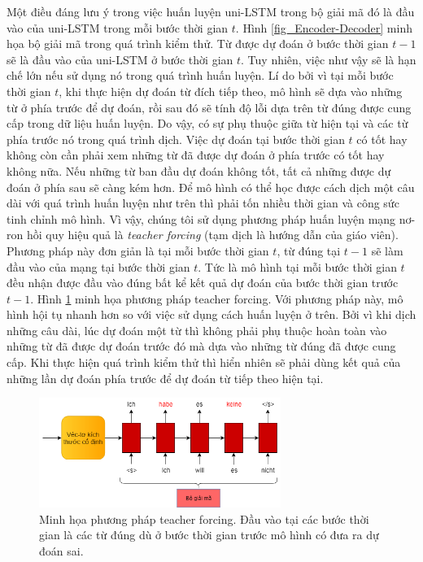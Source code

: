 Một điều đáng lưu ý trong việc huấn luyện uni-LSTM trong bộ giải mã đó là đầu vào của uni-LSTM trong mỗi bước thời gian $t$. Hình \ref{fig_Encoder-Decoder} minh họa bộ giải mã trong quá trình kiểm thử. Từ được dự đoán ở bước thời gian $t-1$ sẽ là đầu vào của uni-LSTM ở bước thời gian $t$. Tuy nhiên, việc như vậy sẽ là hạn chế lớn nếu sử dụng nó trong quá trình huấn luyện. Lí do bởi vì tại mỗi bước thời gian $t$, khi thực hiện dự đoán từ đích tiếp theo, mô hình sẽ dựa vào những từ ở phía trước để dự đoán, rồi sau đó sẽ tính độ lỗi dựa trên từ đúng được cung cấp trong dữ liệu huấn luyện. Do vậy, có sự phụ thuộc giữa từ hiện tại và các từ phía trước nó trong quá trình dịch. Việc dự đoán tại bước thời gian $t$ có tốt hay không còn cần phải xem những từ đã được dự đoán ở phía trước có tốt hay không nữa. Nếu những từ ban đầu dự đoán không tốt, tất cả những được dự đoán ở phía sau sẽ càng kém hơn. Để mô hình có thể học được cách dịch một câu dài với quá trình huấn luyện như trên thì phải tốn nhiều thời gian và công sức tinh chỉnh mô hình. Vì vậy, chúng tôi sử dụng phương pháp huấn luyện mạng nơ-ron hồi quy hiệu quả là \textit{teacher forcing} (tạm dịch là hướng dẫn của giáo viên). Phương pháp này đơn giản là tại mỗi bước thời gian $t$, từ đúng tại $t-1$ sẽ làm đầu vào của mạng tại bước thời gian $t$. Tức là mô hình tại mỗi bước thời gian $t$ đều nhận được đầu vào đúng bất kể kết quả dự đoán của bước thời gian trước $t-1$. Hình \ref{fig_Teacher-forcing} minh họa phương pháp teacher forcing. Với phương pháp này, mô hình hội tụ nhanh hơn so với việc sử dụng cách huấn luyện ở trên. Bởi vì khi dịch những câu dài, lúc dự đoán một từ thì không phải phụ thuộc hoàn toàn vào những từ đã được dự đoán trước đó mà dựa vào những từ đúng đã được cung cấp. Khi thực hiện quá trình kiểm thử thì hiển nhiên sẽ phải dùng kết quả của những lần dự đoán phía trước để dự đoán từ tiếp theo hiện tại. 

\begin{figure}
	\centering
	\includegraphics[width=0.7\textwidth]{Teacher-forcing.png}
	\caption[Minh họa phương pháp teacher forcing.]{Minh họa phương pháp teacher forcing. Đầu vào tại các bước thời gian là các từ đúng dù ở bước thời gian trước mô hình có đưa ra dự đoán sai.}
	\label{fig_Teacher-forcing}
\end{figure}

